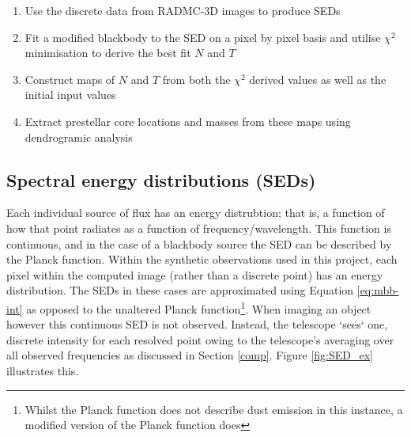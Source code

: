 \documentclass{report}
\begin{document}
\begin{enumerate}
  \item Use the discrete data from RADMC-3D images to produce SEDs
  \item Fit a modified blackbody to the SED on a pixel by pixel basis and utilise $\chi^{2}$ minimisation to derive the best fit $N$ and $T$
  \item Construct maps of $N$ and $T$ from both the $\chi^{2}$ derived values as well as the initial input values
  \item Extract prestellar core locations and masses from these maps using dendrogramic analysis
\end{enumerate}

\subsection{Spectral energy distributions (SEDs)}
Each individual source of flux has an energy distrubtion; that is, a function of how that point radiates as a function of frequency/wavelength. This function is continuous, and in the case of a blackbody source the SED can be described by the Planck function. Within the synthetic observations used in this project, each pixel within the computed image (rather than a discrete point) has an energy distribution. The SEDs in these cases are approximated using Equation \ref{eq:mbb-int} as opposed to the unaltered Planck function\footnote{Whilst the Planck function does not describe dust emission in this instance, a modified version of the Planck function does}. When imaging an object however this continuous SED is not observed. Instead, the telescope `sees` one, discrete intensity for each resolved point owing to the telescope's averaging over all observed frequencies as discussed in Section \ref{comp}. Figure \ref{fig:SED_ex} illustrates this.
\end{document}
